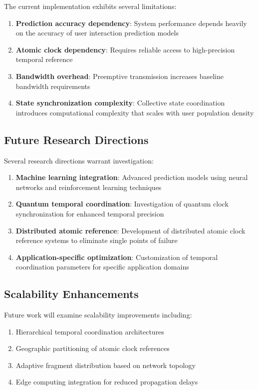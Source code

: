 \documentclass[12pt,a4paper]{article}
\begin{document}
The current implementation exhibits several limitations:

\begin{enumerate}
\item \textbf{Prediction accuracy dependency}: System performance depends heavily on the accuracy of user interaction prediction models
\item \textbf{Atomic clock dependency}: Requires reliable access to high-precision temporal reference
\item \textbf{Bandwidth overhead}: Preemptive transmission increases baseline bandwidth requirements
\item \textbf{State synchronization complexity}: Collective state coordination introduces computational complexity that scales with user population density
\end{enumerate}

\subsection{Future Research Directions}

Several research directions warrant investigation:

\begin{enumerate}
\item \textbf{Machine learning integration}: Advanced prediction models using neural networks and reinforcement learning techniques
\item \textbf{Quantum temporal coordination}: Investigation of quantum clock synchronization for enhanced temporal precision
\item \textbf{Distributed atomic reference}: Development of distributed atomic clock reference systems to eliminate single points of failure
\item \textbf{Application-specific optimization}: Customization of temporal coordination parameters for specific application domains
\end{enumerate}

\subsection{Scalability Enhancements}

Future work will examine scalability improvements including:

\begin{enumerate}
\item Hierarchical temporal coordination architectures
\item Geographic partitioning of atomic clock references
\item Adaptive fragment distribution based on network topology
\item Edge computing integration for reduced propagation delays
\end{enumerate}
\end{document}
